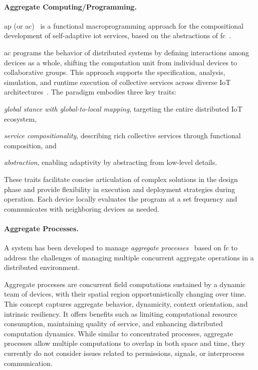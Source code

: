 \documentclass[12pt, a4paper]{article}
\newenvironment{inlinelist}{\begin{enumerate*}[label=\emph{(\roman*)}]}{\end{enumerate*}}
\begin{document}
\sloppypar
\paragraph{Aggregate Computing/Programming.}
\ac{ap} (or \ac{ac})~\cite{CASADEI2019252} is a functional macroprogramming approach for the compositional development
of self-adaptive \ac{iot} services,
based on the abstractions of \ac{fc}~\cite{MAMEIZL04}.

\ac{ac} programs the behavior of distributed systems by defining interactions among devices as a whole,
shifting the computation unit from individual devices to collaborative groups.
%
This approach supports the specification, analysis, simulation,
and runtime execution of collective services across diverse IoT architectures~\cite{FI2020-pulverization}.
%
The paradigm embodies three key traits:
\begin{inlinelist}
    \item \emph{global stance with global-to-local mapping}, targeting the entire distributed IoT ecosystem,
    \item \emph{service compositionality}, describing rich collective services through functional composition, and
    \item \emph{abstraction}, enabling adaptivity by abstracting from low-level details.
\end{inlinelist}
%
These traits facilitate concise articulation of complex solutions in the design phase and provide flexibility in execution and deployment strategies during operation.
%
Each device locally evaluates the program at a set frequency and communicates with neighboring devices as needed.

\sloppypar
\paragraph{Aggregate Processes.}
\label{par:aggregate-processes}

A system has been developed to manage \emph{aggregate processes}~\cite{aggregate-processes} based on \ac{fc}
to address the challenges of managing multiple concurrent aggregate operations in a distributed environment.

Aggregate processes are concurrent field computations sustained by a dynamic team of devices,
with their spatial region opportunistically changing over time.
%
This concept captures aggregate behavior, dynamicity, context orientation, and intrinsic resiliency.
%
It offers benefits such as limiting computational resource consumption, maintaining quality of service,
and enhancing distributed computation dynamics.
%
While similar to concentrated processes,
aggregate processes allow multiple computations to overlap in both space and time,
they currently do not consider issues related to permissions, signals, or interprocess communication.
\end{document}
